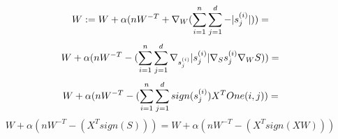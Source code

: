 \begin{answer}
$$ W := W + \alpha (nW^{-T}  + \nabla_{W}(\sum_{i=1}^{n}  \sum_{j=1}^d - |s_j^{(i)}|)) = $$
$$W + \alpha (nW^{-T}  - (\sum_{i=1}^{n}  \sum_{j=1}^d  \nabla_{s_j^{(i)}}|s_j^{(i)}|\nabla_{S}s_j^{(i)} \nabla_{W}S)) = $$
$$W + \alpha (nW^{-T}  - (\sum_{i=1}^{n}  \sum_{j=1}^d  sign(s_j^{(i)})X^T One(i,j))= $$
$$W + \alpha (nW^{-T}  - (X^T sign(S))) =W + \alpha (nW^{-T}  - (X^T sign(XW)))  $$
\end{answer}
